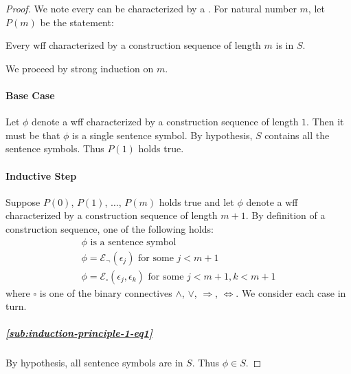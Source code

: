 \documentclass{report}
\begin{document}
  \begin{proof}
    We note every  can be characterized by a
      .
    For natural number $m$, let $P(m)$ be the statement:
      \begin{induction}
        Every wff characterized by a construction sequence of length $m$ is in
          $S$.
      \end{induction}
    \noindent
    We proceed by strong induction on $m$.

    \paragraph{Base Case}%

      Let $\phi$ denote a wff characterized by a construction sequence of length
        $1$.
      Then it must be that $\phi$ is a single sentence symbol.
      By hypothesis, $S$ contains all the sentence symbols.
      Thus $P(1)$ holds true.

    \paragraph{Inductive Step}%

      Suppose $P(0)$, $P(1)$, $\ldots$, $P(m)$ holds true and let $\phi$ denote
        a wff characterized by a construction sequence of length $m + 1$.
      By definition of a construction sequence, one of the following holds:
        \begin{align}
          & \phi \text{ is a sentence symbol}
            & \label{sub:induction-principle-1-eq1} \\
          & \phi = \mathcal{E}_\neg(\epsilon_j)
            \text{ for some } j < m + 1
            & \label{sub:induction-principle-1-eq2} \\
          & \phi = \mathcal{E}_\square(\epsilon_j, \epsilon_k)
            \text{ for some } j < m + 1, k < m + 1
            & \label{sub:induction-principle-1-eq3}
        \end{align}
        where $\square$ is one of the binary connectives $\land$, $\lor$,
          $\Rightarrow$, $\Leftrightarrow$.
      We consider each case in turn.

      \subparagraph{\eqref{sub:induction-principle-1-eq1}}%

        By hypothesis, all sentence symbols are in $S$.
        Thus $\phi \in S$.


\end{proof}
\end{document}
